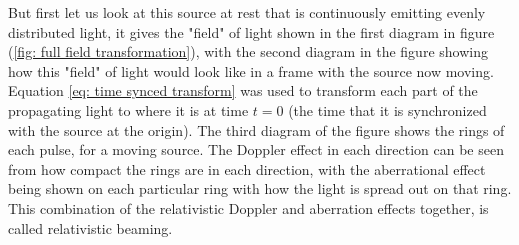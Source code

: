 But first let us look at this source at rest that is continuously emitting evenly distributed light, it gives the "field" of light shown in the first diagram in figure (\ref{fig: full field transformation}), with the second diagram in the figure showing how this "field" of light would look like in a frame with the source now moving.
Equation \eqref{eq: time synced transform} was used to transform each part of the propagating light to where it is at time $t=0$ (the time that it is synchronized with the source at the origin).
The third diagram of the figure shows the rings of each pulse, for a moving source.
The Doppler effect in each direction can be seen from how compact the rings are in each direction, with the aberrational effect being shown on each particular ring with how the light is spread out on that ring.
This combination of the relativistic Doppler and aberration effects together, is called relativistic beaming.


